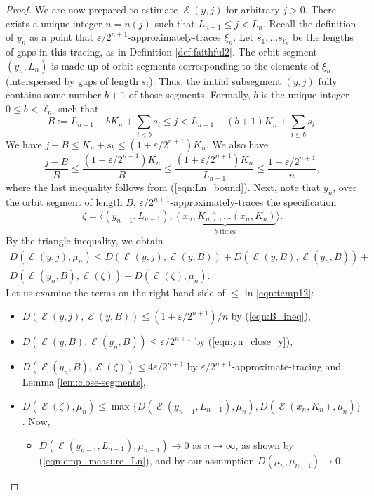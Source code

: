 \documentclass{amsart}
\theoremstyle{definition}
\DeclareMathOperator{\Emp}{\mathcal{E}}%
\newcommand{\eps}{\varepsilon}
\begin{document}
\begin{proof}
We are now prepared to estimate $\Emp(y, j)$ for arbitrary $j>0$. There exists a unique integer $n = n(j)$ such that $L_{n-1} \le j < L_n$. Recall the definition of $y_n$ as a point that $\eps / 2^{n+1}$-approximately-traces $\xi_n$. Let $s_1, \dots s_{\ell_n}$ be the lengths of gaps in this tracing, as in Definition \ref{def:faithful2}. The orbit segment $(y_n, L_n)$ is made up of orbit segments corresponding to the elements of $\xi_n$ (interspersed by gaps of length $s_i$). Thus, the initial subsegment $(y, j)$ fully contains some number $b+1$ of those segments. Formally, $b$ is the unique integer $0 \le b < \ell_n$ such that
\[
B := L_{n-1} + bK_n + \sum_{i < b} s_i \le j < L_{n-1} + (b+1)K_n + \sum_{i \le b} s_i.
\]
We have $j - B \le K_n + s_b \le (1 + \eps / 2^{n+1}) K_n$. We also have
\begin{equation} \label{eqn:B_ineq}
\frac{j - B}{B} \le \frac{(1 + \eps / 2^{n+1}) K_n}{B} \le
\frac{(1 + \eps / 2^{n+1}) K_n}{L_{n-1}} \le \frac{1 + \eps / 2^{n+1}}{n},
\end{equation}
where the last inequality follows from (\ref{eqn:Ln_bound}). Next, note that $y_n$, over the orbit segment of length $B$, $\eps / 2^{n+1}$-approximately-traces the specification
\[
\zeta = \langle
(y_{n-1}, L_{n-1}), \underbrace{(x_n, K_n), \dots (x_n, K_n)}_{b \textrm{ times}}
\rangle.
\]
By the triangle inequality, we obtain
\begin{multline} \label{eqn:temp12}
D(\Emp(y, j), \mu_{n}) \le
D(\Emp(y, j), \Emp(y, B)) + D(\Emp(y, B), \Emp(y_n, B)) + \\
D(\Emp(y_n, B), \Emp(\zeta)) + D(\Emp(\zeta), \mu_{n}).
\end{multline}
Let us examine the terms on the right hand side of $\le$ in \eqref{eqn:temp12}:
\begin{itemize}
  \item $D(\Emp(y, j), \Emp(y, B)) \le (1 + \eps / 2^{n+1}) / n$ by (\ref{eqn:B_ineq}),
  \item $D(\Emp(y, B), \Emp(y_n, B)) \le \eps / 2^{n+1}$ by (\ref{eqn:yn_close_y}),
  \item $D(\Emp(y_n, B), \Emp(\zeta)) \le 4\eps / 2^{n+1}$ by $\eps / 2^{n+1}$-approximate-tracing and Lemma \ref{lem:close-segments},
  \item $D(\Emp(\zeta), \mu_{n}) \le \max \{ D(\Emp(y_{n-1}, L_{n-1}), \mu_{n}), D(\Emp(x_n, K_n), \mu_{n}) \}$.
  Now,
  \begin{itemize}
    \item[$\circ$] $D(\Emp(y_{n-1}, L_{n-1}), \mu_{n-1}) \to 0$ as $n \to \infty$, as shown by (\ref{eqn:emp_measure_Ln}), and by our assumption $D(\mu_n, \mu_{n-1}) \to 0$,

\end{itemize}
\end{itemize}
\end{proof}
\end{document}
